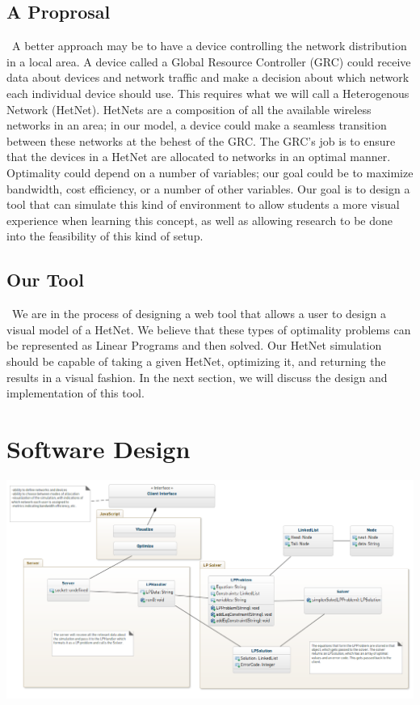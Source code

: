 \documentclass[11pt]{article}
\begin{document}
\subsection{A Proprosal}
~\indent A better approach may be to have a device controlling the network distribution
in a local area. A device called a Global Resource Controller (GRC) could receive
data about devices and network traffic and make a decision about which network
each individual device should use. This requires what we will call a Heterogenous 
Network (HetNet). HetNets are a composition of all the available wireless 
networks in an area; in our model, a device could make a seamless transition
between these networks at the behest of the GRC. The GRC's job is to ensure 
that the devices in a HetNet are allocated to networks in an optimal manner.
Optimality could depend on a number of variables; our goal could be to maximize
bandwidth, cost efficiency, or a number of other variables. Our goal is 
to design a tool that can simulate this kind of environment to allow students 
a more visual experience when learning this concept, as well as allowing research
to be done into the feasibility of this kind of setup.

\subsection{Our Tool}
~\indent We are in the process of designing a web tool that allows a user to design a 
visual model of a HetNet. We believe that these types of optimality problems
can be represented as Linear Programs and then solved. Our HetNet simulation
should be capable of taking a given HetNet, optimizing it, and returning the 
results in a visual fashion. In the next section, we will discuss the 
design and implementation of this tool.


\section{Software Design}

\begin{center}
\includegraphics[width=600px, angle=270]{model.png}
\end{center}
\end{document}
